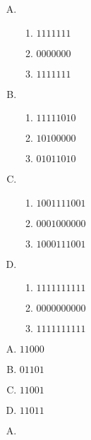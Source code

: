 {{        %
        \begin{practices}
            \begin{enumerate}[A.]
                \item
                \begin{enumerate}[1)]
                    \item $111 1111$
                    \item $000 0000$
                    \item $111 1111$
                \end{enumerate}
                \item
                \begin{enumerate}[1)]
                    \item $1111 1010$
                    \item $1010 0000$
                    \item $0101 1010$
                \end{enumerate}
                \item
                \begin{enumerate}[1)]
                    \item $10 0111 1001$
                    \item $00 0100 0000$
                    \item $10 0011 1001$
                \end{enumerate}
                \item
                \begin{enumerate}[1)]
                    \item $11 1111 1111$
                    \item $00 0000 0000$
                    \item $11 1111 1111$
                \end{enumerate}
            \end{enumerate}
        \end{practices}

        \begin{practices}
            \begin{enumerate}[A.]
                \item $1 1000$
                \item $0 1101$
                \item $1 1001$
                \item $1 1011$
            \end{enumerate}
        \end{practices}

        \begin{practices}
            \begin{enumerate}[A.]
                \item 
            \end{enumerate}
        \end{practices}
    }
}

